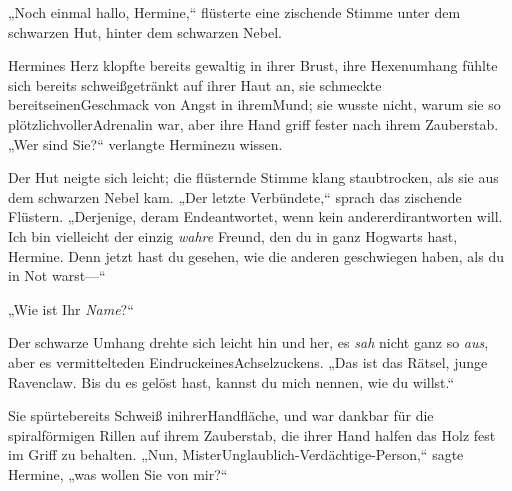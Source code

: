 „Noch einmal hallo, Hermine,“ flüsterte eine zischende Stimme unter dem schwarzen Hut, hinter dem schwarzen Nebel.

Hermines Herz klopfte bereits gewaltig in ihrer Brust, ihre Hexenumhang fühlte sich bereits schweißgetränkt auf ihrer Haut an, sie schmeckte bereitseinenGeschmack von Angst in ihremMund; sie wusste nicht, warum sie so plötzlichvollerAdrenalin war, aber ihre Hand griff fester nach ihrem Zauberstab. „Wer sind Sie?“ verlangte Herminezu wissen.

Der Hut neigte sich leicht; die flüsternde Stimme klang staubtrocken, als sie aus dem schwarzen Nebel kam. „Der letzte Verbündete,“ sprach das zischende Flüstern. „Derjenige, deram Endeantwortet, wenn kein andererdirantworten will. Ich bin vielleicht der einzig \emph{wahre} Freund, den du in ganz Hogwarts hast, Hermine. Denn jetzt hast du gesehen, wie die anderen geschwiegen haben, als du in Not warst—“

„Wie ist Ihr \emph{Name}?“

Der schwarze Umhang drehte sich leicht hin und her, es \emph{sah} nicht ganz so \emph{aus}, aber es vermittelteden EindruckeinesAchselzuckens. „Das ist das Rätsel, junge Ravenclaw. Bis du es gelöst hast, kannst du mich nennen, wie du willst.“

Sie spürtebereits Schweiß inihrerHandfläche, und war dankbar für die spiralförmigen Rillen auf ihrem Zauberstab, die ihrer Hand halfen das Holz fest im Griff zu behalten. „Nun, MisterUnglaublich-Verdächtige-Person,“ sagte Hermine, „was wollen Sie von mir?“


